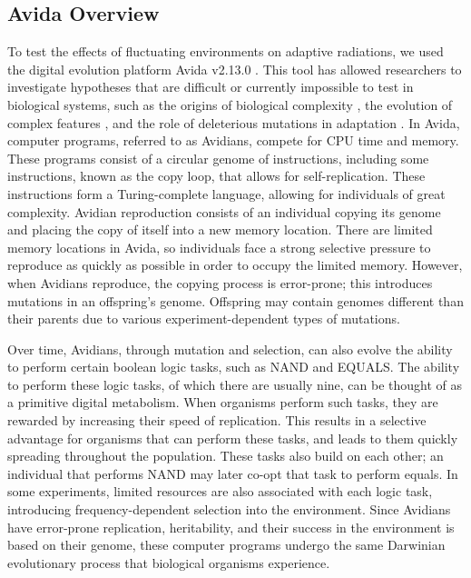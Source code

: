 \documentclass[10pt]{article}
\begin{document}
\subsection{Avida Overview}
To test the effects of fluctuating environments on adaptive radiations, we used the digital evolution platform Avida v2.13.0 \cite{ofria2009avida}.
This tool has allowed researchers to investigate hypotheses that are difficult or currently impossible to test in biological systems, such as the origins of biological complexity \cite{adami2000evolution,lenski1999genome}, the evolution of complex features \cite{lenski2003evolutionary}, and the role of deleterious mutations in adaptation \cite{covert2013experiments}.
In Avida, computer programs, referred to as Avidians, compete for CPU time and memory. These programs consist of a circular genome of instructions, including some instructions, known as the copy loop, that allows for self-replication.
These instructions form a Turing-complete language, allowing for individuals of great complexity.
Avidian reproduction consists of an individual copying its genome and placing the copy of itself into a new memory location.
There are limited memory locations in Avida, so individuals face a strong selective pressure to reproduce as quickly as possible in order to occupy the limited memory.
However, when Avidians reproduce, the copying process is error-prone; this introduces mutations in an offspring's genome.
Offspring may contain genomes different than their parents due to various experiment-dependent types of mutations.

Over time, Avidians, through mutation and selection, can also evolve the ability to perform certain boolean logic tasks, such as NAND and EQUALS.
The ability to perform these logic tasks, of which there are usually nine, can be thought of as a primitive digital metabolism.
When organisms perform such tasks, they are rewarded by increasing their speed of replication.
This results in a selective advantage for organisms that can perform these tasks, and leads to them quickly spreading throughout the population.
These tasks also build on each other; an individual that performs NAND may later co-opt that task to perform equals.
In some experiments, limited resources are also associated with each logic task, introducing frequency-dependent selection into the environment.
Since Avidians have error-prone replication, heritability, and their success in the environment is based on their genome, these computer programs undergo the same Darwinian evolutionary process that biological organisms experience. 
\end{document}
